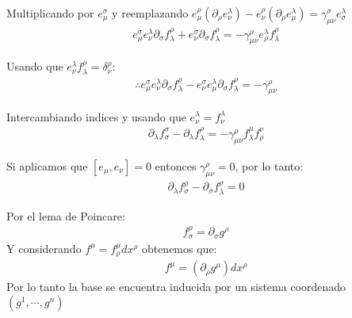 \documentclass{article}
\begin{document}
\hfill 

Multiplicando por $ e_\mu^\sigma $ y reemplazando $ e_\mu^\rho (\partial_\rho e_\nu^\lambda) - e_\nu^\rho (\partial_\rho e_\mu^\lambda) = \gamma^\sigma_{\mu \nu} e_\sigma^\lambda $
\begin{gather*}
  e_\mu^\sigma e_\nu^\lambda \partial_\sigma f_\lambda^\rho + e_\nu^\sigma \partial_\sigma f_\lambda^\rho = - \gamma _{\mu\nu }^\rho e_\rho^\lambda f_\lambda^\rho 
\end{gather*}

\hfill 

Usando que $ e_\nu^\lambda f_\lambda^\rho = \delta_\nu^\rho $:
\begin{gather*}
   \therefore e_\mu^\sigma e_\nu^\lambda \partial_\sigma f_\lambda^\rho - e_\nu^\sigma e_\mu^\lambda \partial_\sigma f_\lambda^\rho = - \gamma _{\mu\nu} ^\rho
\end{gather*}

\hfill 

Intercambiando indices y usando que $ e_\nu^\lambda = f_\nu^\lambda $
\begin{gather*}
  \partial_\lambda f_\sigma^\sigma - \partial_\lambda f_\lambda^\rho  = -\gamma _{\mu\nu} ^ {\rho} f _{\lambda } ^ {\mu} f _{\rho} ^ {\nu}
\end{gather*}

Si aplicamos que $ [e_\mu, e_\nu] = 0  $ entonces $ \gamma _{\mu\nu} ^ {\rho}=0 $, por lo tanto:
\begin{gather*}
  \partial_\lambda f_\sigma^\rho - \partial_\sigma f _\lambda^\rho = 0
\end{gather*}

Por el lema de Poincare: 
\begin{gather*}
  f_\sigma^\rho = \partial_\sigma g^\rho  
\end{gather*}
Y considerando $ f^\mu = f_\rho^\mu dx^\rho $ obtenemos que: 
\begin{gather*}
  f^\mu = (\partial_\rho g^\mu )dx^\rho 
\end{gather*}
Por lo tanto la base se encuentra inducida por un sistema coordenado $ (g^1, \cdots, g^n) $
\end{document}
